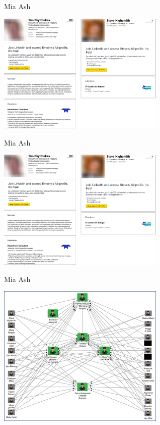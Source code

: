 \documentclass[11pt]{beamer}
\begin{document}
\begin{frame}{Mia Ash \cite{mia_ash_lin}}

\begin{center}
\includegraphics[width=0.6\textwidth]{Pic/linkedfake.png}
\end{center}

\end{frame}

\begin{frame}{Mia Ash \cite{mia_ash_lin}}

\begin{center}
\includegraphics[width=0.6\textwidth]{Pic/linkedfake.png}
\end{center}

\end{frame}

\begin{frame}{Mia Ash \cite{mia_ash_lin}}

\begin{center}
\includegraphics[width=0.6\textwidth]{Pic/linkedinnet.png}
\end{center}

\end{frame}
\end{document}
